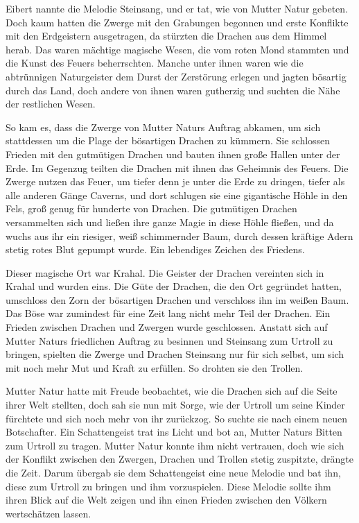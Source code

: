 Eibert nannte die Melodie Steinsang, und er tat, wie von Mutter Natur gebeten. Doch kaum hatten die Zwerge mit den Grabungen begonnen und erste Konflikte mit den Erdgeistern ausgetragen, da stürzten die Drachen aus dem Himmel herab. Das waren mächtige magische Wesen, die vom roten Mond stammten und die Kunst des Feuers beherrschten. Manche unter ihnen waren wie die abtrünnigen Naturgeister dem Durst der Zerstörung erlegen und jagten bösartig durch das Land, doch andere von ihnen waren gutherzig und suchten die Nähe der restlichen Wesen.

So kam es, dass die Zwerge von Mutter Naturs Auftrag abkamen, um sich stattdessen um die Plage der bösartigen Drachen zu kümmern. Sie schlossen Frieden mit den gutmütigen Drachen und bauten ihnen große Hallen unter der Erde. Im Gegenzug teilten die Drachen mit ihnen das Geheimnis des Feuers. Die Zwerge nutzen das Feuer, um tiefer denn je unter die Erde zu dringen, tiefer als alle anderen Gänge Caverns, und dort schlugen sie eine gigantische Höhle in den Fels, groß genug für hunderte von Drachen. Die gutmütigen Drachen versammelten sich und ließen ihre ganze Magie in diese Höhle fließen, und da wuchs aus ihr ein riesiger, weiß schimmernder Baum, durch dessen kräftige Adern stetig rotes Blut gepumpt wurde. Ein lebendiges Zeichen des Friedens.

Dieser magische Ort war Krahal. Die Geister der Drachen vereinten sich in Krahal und wurden eins. Die Güte der Drachen, die den Ort gegründet hatten, umschloss den Zorn der bösartigen Drachen und verschloss ihn im weißen Baum. Das Böse war zumindest für eine Zeit lang nicht mehr Teil der Drachen. Ein Frieden zwischen Drachen und Zwergen wurde geschlossen. Anstatt sich auf Mutter Naturs friedlichen Auftrag zu besinnen und Steinsang zum Urtroll zu bringen, spielten die Zwerge und Drachen Steinsang nur für sich selbst, um sich mit noch mehr Mut und Kraft zu erfüllen. So drohten sie den Trollen.

Mutter Natur hatte mit Freude beobachtet, wie die Drachen sich auf die Seite ihrer Welt stellten, doch sah sie nun mit Sorge, wie der Urtroll um seine Kinder fürchtete und sich noch mehr von ihr zurückzog. So suchte sie nach einem neuen Botschafter. Ein Schattengeist trat ins Licht und bot an, Mutter Naturs Bitten zum Urtroll zu tragen. Mutter Natur konnte ihm nicht vertrauen, doch wie sich der Konflikt zwischen den Zwergen, Drachen und Trollen stetig zuspitzte, drängte die Zeit. Darum übergab sie dem Schattengeist eine neue Melodie und bat ihn, diese zum Urtroll zu bringen und ihm vorzuspielen. Diese Melodie sollte ihm ihren Blick auf die Welt zeigen und ihn einen Frieden zwischen den Völkern wertschätzen lassen.

